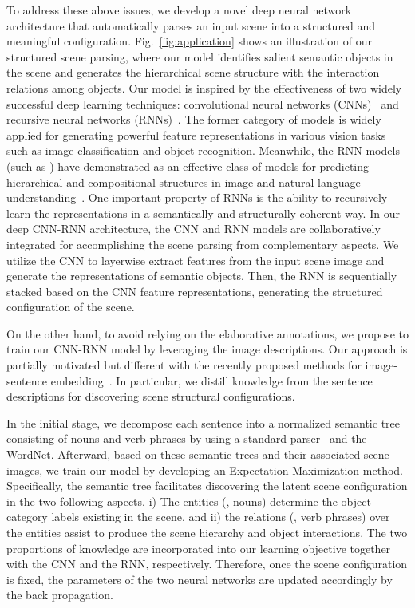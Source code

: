 \documentclass[10pt,twocolumn,letterpaper]{article}
\begin{document}
To address these above issues, we develop a novel deep neural network architecture that automatically parses an input scene into a structured and meaningful configuration. Fig.~\ref{fig:application} shows an illustration of our structured scene parsing, where our model identifies salient semantic objects in the scene and generates the hierarchical scene structure with the interaction relations among objects. Our model is inspired by the effectiveness of two widely successful deep learning techniques: convolutional neural networks (CNNs)~\cite{DBLP:AlexNet}\cite{DBLP:FCnetwork} and recursive neural networks (RNNs)~\cite{DBLP:Recursive_Socher}. The former category of models is widely applied for generating powerful feature representations in various vision tasks such as image classification and object recognition. Meanwhile, the RNN models (such as \cite{DBLP:Recursive_Socher}\cite{DBLP:RecursiveContext}\cite{DBLP:RecursiveContext2}) have demonstrated as an effective class of models for predicting hierarchical and compositional structures in image and natural language understanding~\cite{DBLP:RNN-NLP}. One important property of RNNs is the ability to recursively learn the representations in a semantically and structurally coherent way. In our deep CNN-RNN architecture, the CNN and RNN models are collaboratively integrated for accomplishing the scene parsing from complementary aspects. We utilize the CNN to layerwise extract features from the input scene image and generate the representations of semantic objects. Then, the RNN is sequentially stacked based on the CNN feature representations, generating the structured configuration of the scene.


On the other hand, to avoid relying on the elaborative annotations, we propose to train our CNN-RNN model by leveraging the image descriptions. Our approach is partially motivated but different with the recently proposed methods for image-sentence embedding~\cite{DBLP:VisualAlign-feifei}\cite{DBLP:TellMeShowYou}. In particular, we distill knowledge from the sentence descriptions for discovering scene structural configurations.

In the initial stage, we decompose each sentence into a normalized semantic tree consisting of nouns and verb phrases by using a standard parser~\cite{DBLP:conf/acl/SocherBMN13} and the WordNet\cite{wordnet}. Afterward, based on these semantic trees and their associated scene images, we train our model by developing an Expectation-Maximization method. Specifically, the semantic tree facilitates discovering the latent scene configuration in the two following aspects. i) The entities (\ie, nouns) determine the object category labels existing in the scene, and ii) the relations (\ie, verb phrases) over the entities assist to produce the scene hierarchy and object interactions. The two proportions of knowledge are incorporated into our learning objective together with the CNN and the RNN, respectively. Therefore, once the scene configuration is fixed, the parameters of the two neural networks are updated accordingly by the back propagation.
\end{document}
